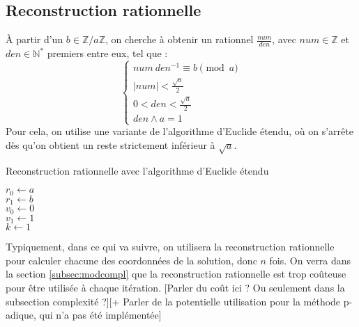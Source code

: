 \documentclass[french]{article}
\begin{document}
\subsection{Reconstruction rationnelle} \label{subsec:recrat}
À partir d'un $b \in \mathbb{Z}/a\mathbb{Z}$, on cherche à obtenir un rationnel $\frac{num}{den}$, avec $num \in \mathbb{Z}$ et $den \in \mathbb{N}^*$ premiers entre eux, tel que :
\begin{equation*}
	\begin{cases}
		num \  den^{-1} \equiv b \pmod a\\
		\lvert num \rvert < \frac{\sqrt{a}}{2}\\
		0 < den < \frac{\sqrt{a}}{2}\\
		den \wedge a = 1
	\end{cases}
\end{equation*}
Pour cela, on utilise une variante de l'algorithme d'Euclide étendu, où on s'arrête dès qu'on obtient un reste strictement inférieur à $\sqrt{a}$.\newline\newline
\begin{algorithm}[H]
	\DontPrintSemicolon
	\caption{Reconstruction rationnelle avec l'algorithme d'Euclide étendu}
	$r_0 \gets a$\\
	$r_1 \gets b$\\
	$v_0 \gets 0$\\
	$v_1 \gets 1$\\
	$k \gets 1$\\
\end{algorithm}
\leavevmode \newline
Typiquement, dans ce qui va suivre, on utilisera la reconstruction rationnelle pour calculer chacune des coordonnées de la solution, donc $n$ fois.
\newline
On verra dans la section \ref{subsec:modcompl} que la reconstruction rationnelle est trop coûteuse pour être utilisée à chaque itération. [Parler du coût ici ? Ou seulement dans la subsection complexité ?][+ Parler de la potentielle utilisation pour la méthode p-adique, qui n'a pas été implémentée]
\end{document}
